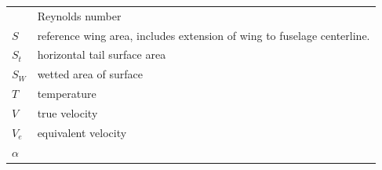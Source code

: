 \documentclass[
]{book}
\begin{document}
\begin{longtable}[]{@{}ll@{}}
\begin{minipage}[t]{0.22\columnwidth}
\end{minipage} & \begin{minipage}[t]{0.72\columnwidth}\raggedright
Reynolds number\strut
\end{minipage}\tabularnewline
\begin{minipage}[t]{0.22\columnwidth}\raggedright
\(S\)\strut
\end{minipage} & \begin{minipage}[t]{0.72\columnwidth}\raggedright
reference wing area, includes extension of wing to fuselage centerline.\strut
\end{minipage}\tabularnewline
\begin{minipage}[t]{0.22\columnwidth}\raggedright
\(S_t\)\strut
\end{minipage} & \begin{minipage}[t]{0.72\columnwidth}\raggedright
horizontal tail surface area\strut
\end{minipage}\tabularnewline
\begin{minipage}[t]{0.22\columnwidth}\raggedright
\(S_W\)\strut
\end{minipage} & \begin{minipage}[t]{0.72\columnwidth}\raggedright
wetted area of surface\strut
\end{minipage}\tabularnewline
\begin{minipage}[t]{0.22\columnwidth}\raggedright
\(T\)\strut
\end{minipage} & \begin{minipage}[t]{0.72\columnwidth}\raggedright
temperature\strut
\end{minipage}\tabularnewline
\begin{minipage}[t]{0.22\columnwidth}\raggedright
\(V\)\strut
\end{minipage} & \begin{minipage}[t]{0.72\columnwidth}\raggedright
true velocity\strut
\end{minipage}\tabularnewline
\begin{minipage}[t]{0.22\columnwidth}\raggedright
\(V_e\)\strut
\end{minipage} & \begin{minipage}[t]{0.72\columnwidth}\raggedright
equivalent velocity\strut
\end{minipage}\tabularnewline
\begin{minipage}[t]{0.22\columnwidth}\raggedright
\(\alpha\)\strut
\end{minipage} & \begin{minipage}[t]{0.72\columnwidth}\raggedright

\end{minipage}
\end{longtable}
\end{document}
